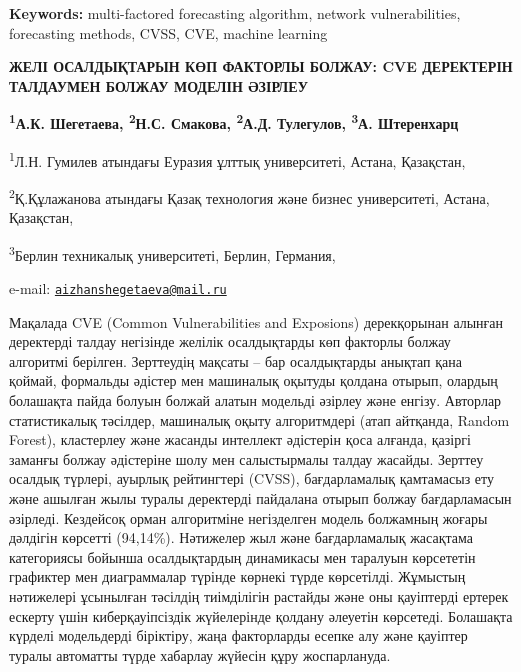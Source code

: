 {\bfseries Keywords:} multi-factored forecasting algorithm, network
vulnerabilities, forecasting methods, CVSS, CVE, machine learning

\begin{articleheader}
{\bfseries ЖЕЛІ ОСАЛДЫҚТАРЫН КӨП ФАКТОРЛЫ БОЛЖАУ: CVE ДЕРЕКТЕРІН ТАЛДАУМЕН БОЛЖАУ МОДЕЛІН ӘЗІРЛЕУ}

{\bfseries
\textsuperscript{1}А.К. Шегетаева\textsuperscript{\envelope },
\textsuperscript{2}Н.С. Смакова,
\textsuperscript{2}А.Д. Тулегулов,
\textsuperscript{3}А. Штеренхарц
}
\end{articleheader}

\begin{affiliation}
\textsuperscript{1}Л.Н. Гумилев атындағы Еуразия ұлттық университеті, Астана, Қазақстан,

\textsuperscript{2}Қ.Құлажанова атындағы Қазақ технология және бизнес университеті, Астана, Қазақстан,

\textsuperscript{3}Берлин техникалық университеті, Берлин, Германия,

e-mail: \href{mailto:aizhanshegetaeva@mail.ru}{\nolinkurl{aizhanshegetaeva@mail.ru}}
\end{affiliation}

Мақалада CVE (Common Vulnerabilities and Exposions) дерекқорынан алынған
деректерді талдау негізінде желілік осалдықтарды көп факторлы болжау
алгоритмі берілген. Зерттеудің мақсаты -- бар осалдықтарды анықтап қана
қоймай, формальды әдістер мен машиналық оқытуды қолдана отырып, олардың
болашақта пайда болуын болжай алатын модельді әзірлеу және енгізу.
Авторлар статистикалық тәсілдер, машиналық оқыту алгоритмдері (атап
айтқанда, Random Forest), кластерлеу және жасанды интеллект әдістерін
қоса алғанда, қазіргі заманғы болжау әдістеріне шолу мен салыстырмалы
талдау жасайды. Зерттеу осалдық түрлері, ауырлық рейтингтері (CVSS),
бағдарламалық қамтамасыз ету және ашылған жылы туралы деректерді
пайдалана отырып болжау бағдарламасын әзірледі. Кездейсоқ орман
алгоритміне негізделген модель болжамның жоғары дәлдігін көрсетті
(94,14\%). Нәтижелер жыл және бағдарламалық жасақтама категориясы
бойынша осалдықтардың динамикасы мен таралуын көрсететін графиктер мен
диаграммалар түрінде көрнекі түрде көрсетілді. Жұмыстың нәтижелері
ұсынылған тәсілдің тиімділігін растайды және оны қауіптерді ертерек
ескерту үшін киберқауіпсіздік жүйелерінде қолдану әлеуетін көрсетеді.
Болашақта күрделі модельдерді біріктіру, жаңа факторларды есепке алу
және қауіптер туралы автоматты түрде хабарлау жүйесін құру жоспарлануда.

